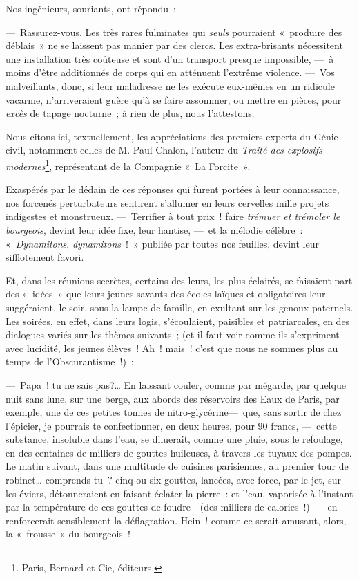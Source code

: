 \documentclass[french,twoside]{book} %
\begin{document}
Nos ingénieurs, souriants, ont répondu :\par
— Rassurez-vous. Les très rares fulminates qui \emph{seuls} pourraient « produire des déblais » ne se laissent pas manier par des clercs. Les extra-brisants nécessitent une installation très coûteuse   et sont d’un transport presque impossible, — à moins d’être additionnés de corps qui en atténuent l’extrême violence. — Vos malveillants, donc, si leur maladresse ne les exécute eux-mêmes en un ridicule vacarme, n’arriveraient guère qu’à se faire assommer, ou mettre en pièces, pour \emph{excès} de tapage nocturne ; à rien de plus, nous l’attestons.\par
Nous citons ici, textuellement, les appréciations des premiers experts du Génie civil, notamment celles de M. Paul Chalon, l’auteur du \emph{Traité des explosifs modernes}\footnote{Paris, Bernard et Cie, éditeurs.}, représentant de la Compagnie « La Forcite ».\par
Exaspérés par le dédain de ces réponses qui furent portées à leur connaissance, nos forcenés perturbateurs sentirent s’allumer en leurs cervelles mille projets indigestes et monstrueux. — Terrifier à tout prix ! faire \emph{trémuer et trémoler le bourgeois}, devint leur idée fixe, leur hantise, — et la mélodie célèbre : « \emph{Dynamitons},  \emph{ dynamitons} ! » publiée par toutes nos feuilles, devint leur sifflotement favori.\par
Et, dans les réunions secrètes, certains des leurs, les plus éclairés, se faisaient part des « idées » que leurs jeunes savants des écoles laïques et obligatoires leur suggéraient, le soir, sous la lampe de famille, en exultant sur les genoux paternels. Les soirées, en effet, dans leurs logis, s’écoulaient, paisibles et patriarcales, en des dialogues variés sur les thèmes suivants ; (et il faut voir comme ils s’expriment avec lucidité, les jeunes élèves ! Ah ! mais ! c’est que nous ne sommes plus au temps de l’Obscurantisme !) :\par
— Papa ! tu ne sais pas?… En laissant couler, comme par mégarde, par quelque nuit sans lune, sur une berge, aux abords des réservoirs des Eaux de Paris, par exemple, une de ces petites tonnes de nitro-glycérine— que, sans sortir de chez l’épicier, je pourrais te confectionner, en deux heures, pour 90 francs, — cette substance, insoluble dans l’eau, se diluerait, comme une pluie, sous le refoulage, en des centaines de milliers de gouttes huileuses, à travers les tuyaux   des pompes. Le matin suivant, dans une multitude de cuisines parisiennes, au premier tour de robinet… comprends-tu ? cinq ou six gouttes, lancées, avec force, par le jet, sur les éviers, détonneraient en faisant éclater la pierre : et l’eau, vaporisée à l’instant par la température de ces gouttes de foudre—(des milliers de calories !) — en renforcerait sensiblement la déflagration. Hein ! comme ce serait amusant, alors, la « frousse » du bourgeois !\par
\end{document}
